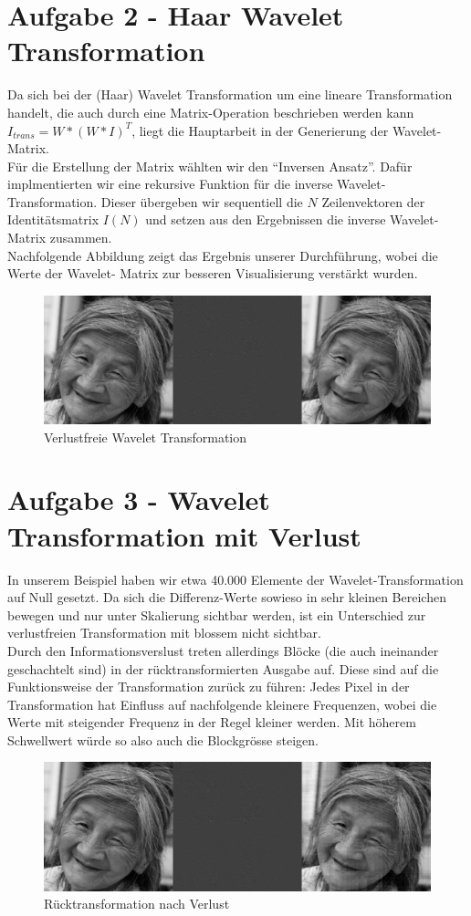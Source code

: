 \section*{Aufgabe 2 - Haar Wavelet Transformation}
Da sich bei der (Haar) Wavelet Transformation um eine lineare Transformation handelt, die auch
durch eine Matrix-Operation beschrieben werden kann $I_{trans} = W * (W*I)^{T}$, liegt die
Hauptarbeit in der Generierung der Wavelet-Matrix.
\\
F\"ur die Erstellung der Matrix w\"ahlten wir den ``Inversen Ansatz''. Daf\"ur implmentierten wir
eine rekursive Funktion f\"ur die inverse Wavelet-Transformation. Dieser \"ubergeben wir sequentiell die $N$ Zeilenvektoren der Identit\"atsmatrix $I(N)$ und setzen aus den Ergebnissen die inverse
Wavelet-Matrix zusammen.
\\
Nachfolgende Abbildung zeigt das Ergebnis unserer Durchf\"uhrung, wobei die Werte der Wavelet-
Matrix zur besseren Visualisierung verst\"arkt wurden.

\begin{figure}[H]
\begin{center}
\includegraphics[width=150mm]{u04/task2.eps}
\end{center}
\caption{Verlustfreie Wavelet Transformation}
\end{figure}


\section*{Aufgabe 3 - Wavelet Transformation mit Verlust}
In unserem Beispiel haben wir etwa 40.000 Elemente der Wavelet-Transformation auf Null gesetzt.
Da sich die Differenz-Werte sowieso in sehr kleinen Bereichen bewegen und nur unter Skalierung 
sichtbar werden, ist ein Unterschied zur verlustfreien Transformation mit blossem nicht sichtbar.
\\
Durch den Informationsverslust treten allerdings Bl\"ocke (die auch ineinander geschachtelt sind)
in der r\"ucktransformierten Ausgabe auf. Diese sind auf die Funktionsweise der Transformation
zur\"uck zu f\"uhren: Jedes Pixel in der Transformation hat Einfluss auf nachfolgende kleinere
Frequenzen, wobei die Werte mit steigender Frequenz in der Regel kleiner werden. Mit h\"oherem
Schwellwert w\"urde so also auch die Blockgr\"osse steigen. 

\begin{figure}[H]
\begin{center}
\includegraphics[width=150mm]{u04/task3.eps}
\end{center}
\caption{R\"ucktransformation nach Verlust}
\end{figure}


